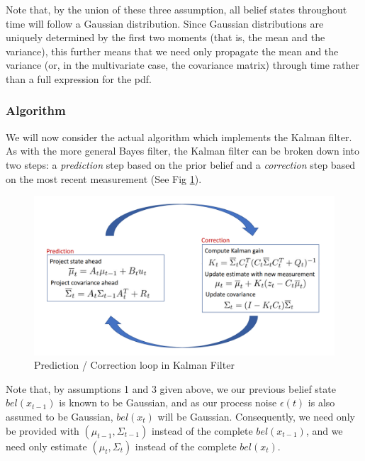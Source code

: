 \documentclass[twoside]{article}
\begin{document}
Note that, by the union of these three assumption, all belief states throughout time will follow a Gaussian distribution. Since Gaussian distributions are uniquely determined by the first two moments (that is, the mean and the variance), this further means that we need only propagate the mean and the variance (or, in the multivariate case, the covariance matrix) through time rather than a full expression for the pdf.

\subsubsection{Algorithm}
We will now consider the actual algorithm which implements the Kalman filter. As with the more general Bayes filter, the Kalman filter can be broken down into two steps: a {\it prediction} step based on the prior belief and a {\it correction} step based on the most recent measurement (See Fig \ref{fig:KF_pred_corr}).

\begin{figure}[h]
\centering
  \includegraphics[width=.9\linewidth]{KF_pred_corr.png}
  \caption{Prediction / Correction loop in Kalman Filter}
\label{fig:KF_pred_corr}
\end{figure}

\par
Note that, by assumptions 1 and 3 given above, we our previous belief state $bel(x_{t-1})$ is known to be Gaussian, and as our process noise $\epsilon(t)$ is also assumed to be Gaussian, $bel(x_t)$ will be Gaussian. Consequently, we need only be provided with $(\mu_{t-1}, \Sigma_{t-1})$ instead of the complete $bel(x_{t-1})$, and we need only estimate $(\mu_{t}, \Sigma_{t})$ instead of the complete $bel(x_{t})$.
\end{document}
